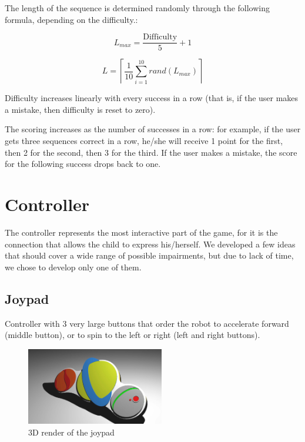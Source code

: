 \documentclass[a4paper,twoside]{book}
\begin{document}
\begin{description}
The length of the sequence is determined randomly through the following formula, depending on the difficulty.:

\[L_{max} = \frac{\mathrm{Difficulty}}{5}+1\]

\[L = \left \lceil \frac{1}{10}\sum_{i=1}^{10} rand\left(L_{max}\right) \right \rceil\]

Difficulty increases linearly with every success in a row (that is, if the user makes a mistake, then difficulty is reset to zero).

The scoring increases as the number of successes in a row: for example, if the user gets three sequences correct in a row, he/she will receive 1 point for the first, then 2 for the second, then 3 for the third. If the user makes a mistake, the score for the following success drops back to one.
\end{description}

\section{Controller}
\label{sec:contr}

The controller represents the most interactive part of the game, for it is the connection that allows the child to express his/herself.
We developed a few ideas that should cover a wide range of possible impairments, but due to lack of time, we chose to develop only one of them.

\subsection{Joypad}
Controller with 3 very large buttons that order the robot to accelerate forward (middle button), or to spin to the left or right (left and right buttons).

\begin{figure}
 \includegraphics[width=6cm]{img/controller}
 \caption{3D render of the joypad}
\end{figure}
\end{document}
